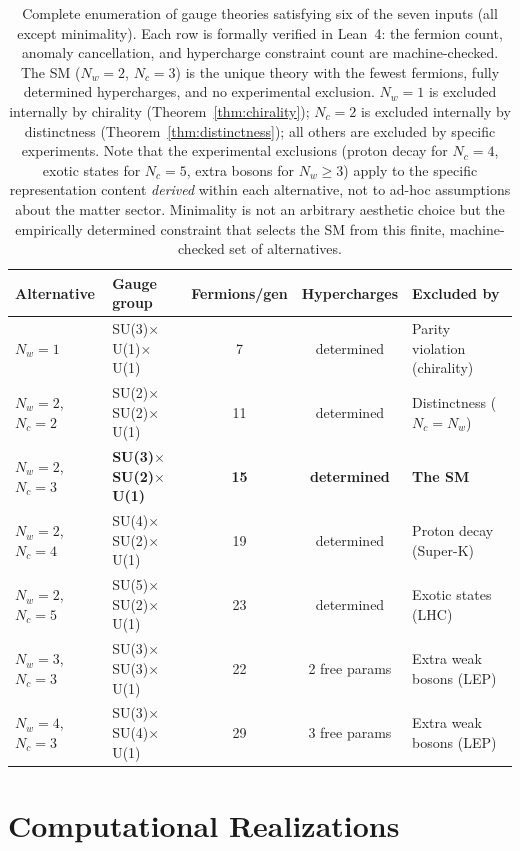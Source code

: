 \documentclass[12pt,a4paper]{article}
\begin{document}
\begin{table}[h]
\centering
\begin{tabular}{llccl}
\toprule
Alternative & Gauge group & Fermions/gen & Hypercharges & Excluded by \\
\midrule
$N_w = 1$ & SU(3)$\times$U(1)$\times$U(1) & 7 & determined & Parity violation (chirality) \\
$N_w = 2$, $N_c = 2$ & SU(2)$\times$SU(2)$\times$U(1) & 11 & determined & Distinctness ($N_c = N_w$) \\
$N_w = 2$, $N_c = 3$ & \textbf{SU(3)$\times$SU(2)$\times$U(1)} & \textbf{15} & \textbf{determined} & \textbf{The SM} \\
$N_w = 2$, $N_c = 4$ & SU(4)$\times$SU(2)$\times$U(1) & 19 & determined & Proton decay (Super-K) \\
$N_w = 2$, $N_c = 5$ & SU(5)$\times$SU(2)$\times$U(1) & 23 & determined & Exotic states (LHC) \\
$N_w = 3$, $N_c = 3$ & SU(3)$\times$SU(3)$\times$U(1) & 22 & 2 free params & Extra weak bosons (LEP) \\
$N_w = 4$, $N_c = 3$ & SU(3)$\times$SU(4)$\times$U(1) & 29 & 3 free params & Extra weak bosons (LEP) \\
\bottomrule
\end{tabular}
\caption{Complete enumeration of gauge theories satisfying six of the seven inputs (all except minimality).  Each row is formally verified in Lean~4: the fermion count, anomaly cancellation, and hypercharge constraint count are machine-checked.  The SM ($N_w = 2$, $N_c = 3$) is the unique theory with the fewest fermions, fully determined hypercharges, and no experimental exclusion.  $N_w = 1$ is excluded internally by chirality (Theorem~\ref{thm:chirality}); $N_c = 2$ is excluded internally by distinctness (Theorem~\ref{thm:distinctness}); all others are excluded by specific experiments.  Note that the experimental exclusions (proton decay for $N_c = 4$, exotic states for $N_c = 5$, extra bosons for $N_w \geq 3$) apply to the specific representation content \emph{derived} within each alternative, not to ad-hoc assumptions about the matter sector.  Minimality is not an arbitrary aesthetic choice but the empirically determined constraint that selects the SM from this finite, machine-checked set of alternatives.}
\label{tab:alternatives}
\end{table}

\section{Computational Realizations}
\end{document}
